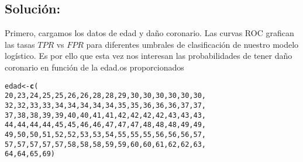 \documentclass[paper=letter, fontsize=11pt, draft=false]{scrartcl}\usepackage[]{graphicx}\usepackage[]{xcolor}
\makeatletter
\newcommand{\hlnum}[1]{\textcolor[rgb]{0.686,0.059,0.569}{#1}}%
\newcommand{\hldef}[1]{\textcolor[rgb]{0.345,0.345,0.345}{#1}}%
\newcommand{\hlkwb}[1]{\textcolor[rgb]{0.69,0.353,0.396}{#1}}%
\newcommand{\hlkwd}[1]{\textcolor[rgb]{0.737,0.353,0.396}{\textbf{#1}}}%
\newenvironment{kframe}{%
 \def\at@end@of@kframe{}%
 \ifinner\ifhmode%
  \def\at@end@of@kframe{\end{minipage}}%
  \begin{minipage}{\columnwidth}%
 \fi\fi%
 \def\FrameCommand##1{\hskip\@totalleftmargin \hskip-\fboxsep
 \colorbox{shadecolor}{##1}\hskip-\fboxsep
     \hskip-\linewidth \hskip-\@totalleftmargin \hskip\columnwidth}%
 \MakeFramed {\advance\hsize-\width
   \@totalleftmargin\z@ \linewidth\hsize
   \@setminipage}}%
 {\par\unskip\endMakeFramed%
 \at@end@of@kframe}
\newenvironment{knitrout}{}{} %
\numberwithin{equation}{problemcounter} %
\numberwithin{figure}{problemcounter} %
\numberwithin{table}{problemcounter} %
\numberwithin{subsection}{problemcounter}
\makeatother
\begin{document}
\subsection{\textbf{Solución:}}

Primero, cargamos los datos de edad y daño coronario. Las curvas ROC grafican las tasas $TPR$ vs $FPR$ para diferentes umbrales de clasificación de nuestro modelo logístico. Es por ello que esta vez nos interesan las probabilidades de tener daño coronario en función de la edad.os proporcionados

\begin{knitrout}
\color{fgcolor}\begin{kframe}
\begin{alltt}
\hldef{edad} \hlkwb{<-} \hlkwd{c}\hldef{(}
    \hlnum{20}\hldef{,} \hlnum{23}\hldef{,} \hlnum{24}\hldef{,} \hlnum{25}\hldef{,} \hlnum{25}\hldef{,} \hlnum{26}\hldef{,} \hlnum{26}\hldef{,} \hlnum{28}\hldef{,} \hlnum{28}\hldef{,} \hlnum{29}\hldef{,} \hlnum{30}\hldef{,} \hlnum{30}\hldef{,} \hlnum{30}\hldef{,} \hlnum{30}\hldef{,} \hlnum{30}\hldef{,} \hlnum{30}\hldef{,}
    \hlnum{32}\hldef{,} \hlnum{32}\hldef{,} \hlnum{33}\hldef{,} \hlnum{33}\hldef{,} \hlnum{34}\hldef{,} \hlnum{34}\hldef{,} \hlnum{34}\hldef{,} \hlnum{34}\hldef{,} \hlnum{34}\hldef{,} \hlnum{35}\hldef{,} \hlnum{35}\hldef{,} \hlnum{36}\hldef{,} \hlnum{36}\hldef{,} \hlnum{36}\hldef{,} \hlnum{37}\hldef{,} \hlnum{37}\hldef{,}
    \hlnum{37}\hldef{,} \hlnum{38}\hldef{,} \hlnum{38}\hldef{,} \hlnum{39}\hldef{,} \hlnum{39}\hldef{,} \hlnum{40}\hldef{,} \hlnum{40}\hldef{,} \hlnum{41}\hldef{,} \hlnum{41}\hldef{,} \hlnum{42}\hldef{,} \hlnum{42}\hldef{,} \hlnum{42}\hldef{,} \hlnum{42}\hldef{,} \hlnum{43}\hldef{,} \hlnum{43}\hldef{,} \hlnum{43}\hldef{,}
    \hlnum{44}\hldef{,} \hlnum{44}\hldef{,} \hlnum{44}\hldef{,} \hlnum{44}\hldef{,} \hlnum{45}\hldef{,} \hlnum{45}\hldef{,} \hlnum{46}\hldef{,} \hlnum{46}\hldef{,} \hlnum{47}\hldef{,} \hlnum{47}\hldef{,} \hlnum{47}\hldef{,} \hlnum{48}\hldef{,} \hlnum{48}\hldef{,} \hlnum{48}\hldef{,} \hlnum{49}\hldef{,} \hlnum{49}\hldef{,}
    \hlnum{49}\hldef{,} \hlnum{50}\hldef{,} \hlnum{50}\hldef{,} \hlnum{51}\hldef{,} \hlnum{52}\hldef{,} \hlnum{52}\hldef{,} \hlnum{53}\hldef{,} \hlnum{53}\hldef{,} \hlnum{54}\hldef{,} \hlnum{55}\hldef{,} \hlnum{55}\hldef{,} \hlnum{55}\hldef{,} \hlnum{56}\hldef{,} \hlnum{56}\hldef{,} \hlnum{56}\hldef{,} \hlnum{57}\hldef{,}
    \hlnum{57}\hldef{,} \hlnum{57}\hldef{,} \hlnum{57}\hldef{,} \hlnum{57}\hldef{,} \hlnum{57}\hldef{,} \hlnum{58}\hldef{,} \hlnum{58}\hldef{,} \hlnum{58}\hldef{,} \hlnum{59}\hldef{,} \hlnum{59}\hldef{,} \hlnum{60}\hldef{,} \hlnum{60}\hldef{,} \hlnum{61}\hldef{,} \hlnum{62}\hldef{,} \hlnum{62}\hldef{,} \hlnum{63}\hldef{,}
    \hlnum{64}\hldef{,} \hlnum{64}\hldef{,} \hlnum{65}\hldef{,} \hlnum{69}\hldef{)}


\end{alltt}
\end{kframe}
\end{knitrout}
\end{document}
